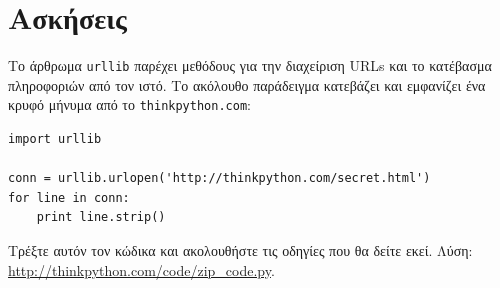 \documentclass[10pt]{book}
\begin{document}
\section{Ασκήσεις}

\begin{exercise}
\label{urllib}

Το άρθρωμα {\tt urllib} παρέχει μεθόδους για την διαχείριση  URLs  και το κατέβασμα πληροφοριών από τον ιστό.
Το ακόλουθο παράδειγμα κατεβάζει και εμφανίζει ένα κρυφό μήνυμα από το {\tt thinkpython.com}:

\begin{verbatim}
import urllib

conn = urllib.urlopen('http://thinkpython.com/secret.html')
for line in conn:
    print line.strip()
\end{verbatim}

Τρέξτε αυτόν τον κώδικα και ακολουθήστε τις οδηγίες που θα δείτε εκεί. 
Λύση: \url{http://thinkpython.com/code/zip_code.py}.

\end{exercise}





%

\end{document}
